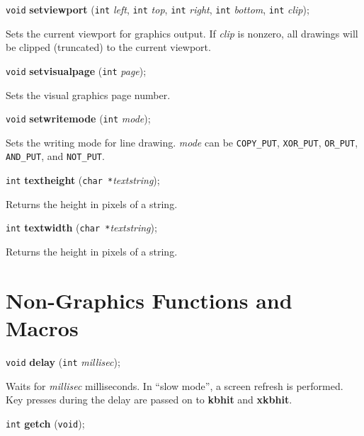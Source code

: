 \documentclass[a4paper,11pt]{article}
\newcommand{\V}{\texttt{void}}      %
\newcommand{\I}{\texttt{int}}       %
\newcommand{\C}{\texttt{char *}}    %
\newcommand{\func}[1]{\textbf{#1}}  %
\newcommand{\A}[1]{\emph{#1}}       %
\newcommand{\T}[1]{\texttt{#1}}     %
\newenvironment{bgi}
{ %
  \begin{snugshade}
}
{ %
  \end{snugshade}
}
\begin{document}

\begin{bgi}
\V{} \func{setviewport} (\I{} \A{left}, \I{} \A{top}, \I{} \A{right},
\I{} \A{bottom}, \I{} \A{clip});
\end{bgi}

Sets the current viewport for graphics output. If \A{clip} is nonzero,
all drawings will be clipped (truncated) to the current viewport.


\begin{bgi}
\V{} \func{setvisualpage} (\I{} \A{page});
\end{bgi}

Sets the visual graphics page number.


\begin{bgi}
\V{} \func{setwritemode} (\I{} \A{mode});
\end{bgi}

Sets the writing mode for line drawing. \A{mode} can be \T{COPY\_PUT},
\T{XOR\-\_PUT}, \T{OR\_PUT}, \T{AND\_PUT}, and \T{NOT\_PUT}.


\begin{bgi}
\I{} \func{textheight} (\C{}\A{textstring});
\end{bgi}

Returns the height in pixels of a string.


\begin{bgi}
\I{} \func{textwidth} (\C{}\A{textstring});
\end{bgi}

Returns the height in pixels of a string.


\section{Non-Graphics Functions and Macros}

\begin{bgi}
\V{} \func{delay} (\I{} \A{millisec});
\end{bgi}

Waits for \A{millisec} milliseconds. In ``slow mode'', a screen
refresh is performed. Key presses during the delay are passed on to
\func{kbhit} and \func{xkbhit}.


\begin{bgi}
\I{} \func{getch} (\V{});
\end{bgi}
\end{document}

